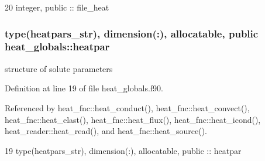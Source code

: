 \begin{DoxyCode}
20   \textcolor{keywordtype}{integer}, \textcolor{keywordtype}{public} :: file_heat
\end{DoxyCode}
\subsubsection[{heatpar}]{\setlength{\rightskip}{0pt plus 5cm}type({\bf heatpars\+\_\+str}), dimension(\+:), allocatable, public heat\+\_\+globals\+::heatpar}\label{namespaceheat__globals_a6309c12e240392d62f10861b507b7896}


structure of solute parameters 



Definition at line 19 of file heat\+\_\+globals.\+f90.



Referenced by heat\+\_\+fnc\+::heat\+\_\+conduct(), heat\+\_\+fnc\+::heat\+\_\+convect(), heat\+\_\+fnc\+::heat\+\_\+elast(), heat\+\_\+fnc\+::heat\+\_\+flux(), heat\+\_\+fnc\+::heat\+\_\+icond(), heat\+\_\+reader\+::heat\+\_\+read(), and heat\+\_\+fnc\+::heat\+\_\+source().


\begin{DoxyCode}
19   \textcolor{keywordtype}{type}(heatpars_str), \textcolor{keywordtype}{dimension(:)}, \textcolor{keywordtype}{allocatable}, \textcolor{keywordtype}{public} :: heatpar
\end{DoxyCode}

